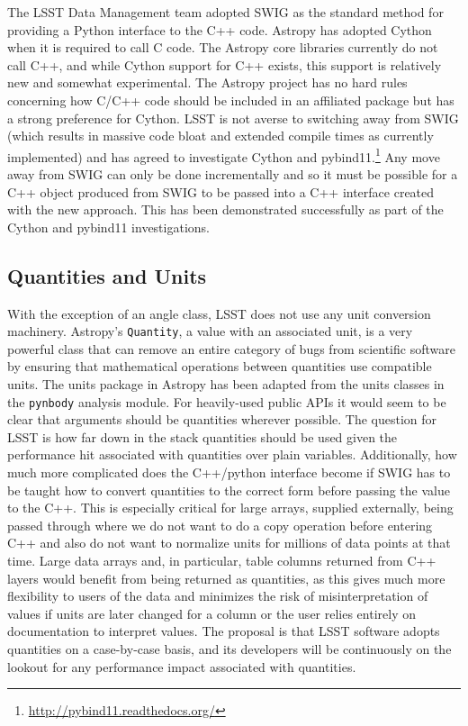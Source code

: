 \documentclass[]{spie}  %
\begin{document}
The LSST Data Management team adopted SWIG as the standard method for providing a Python interface to the C++ code.
Astropy has adopted Cython\cite{2010/content/aip/journal/cise/13/2/10.1109/MCSE.2010.118} when it is required to call C code.
The Astropy core libraries currently do not call C++, and while Cython support for C++ exists, this support is relatively new and somewhat experimental.
The Astropy project has no hard rules concerning how C/C++ code should be included in an affiliated package but has a strong preference for Cython.
LSST is not averse to switching away from SWIG (which results in massive code bloat and extended compile times as currently implemented) and has agreed to investigate Cython\cite{dmtn-013} and pybind11.\cite{dmtn-014}\footnote{\url{http://pybind11.readthedocs.org/}}
Any move away from SWIG can only be done incrementally and so it must be possible for a C++ object produced from SWIG to be passed into a C++ interface created with the new approach.
This has been demonstrated successfully as part of the Cython and pybind11 investigations.

\subsection{Quantities and Units}

With the exception of an angle class, LSST does not use any unit conversion machinery.
Astropy's \texttt{Quantity}, a value with an associated unit, is a very powerful class that can remove an entire category of bugs from scientific software by ensuring that mathematical operations between quantities use compatible units.
The units package in Astropy has been adapted from the units classes in the \texttt{pynbody} analysis module\cite{pynbody}.
For heavily-used public APIs it would seem to be clear that arguments should be quantities wherever possible.
The question for LSST is how far down in the stack quantities should be used given the performance hit associated with quantities over plain variables.
Additionally, how much more complicated does the C++/python interface become if SWIG has to be taught how to convert quantities to the correct form before passing the value to the C++.
This is especially critical for large arrays, supplied externally, being passed through where we do not want to do a copy operation before entering C++ and also do not want to normalize units for millions of data points at that time.
Large data arrays and, in particular, table columns returned from C++ layers would benefit from being returned as quantities, as this gives much more flexibility to users of the data and minimizes the risk of misinterpretation of values if units are later changed for a column or the user relies entirely on documentation to interpret values.
The proposal is that LSST software adopts quantities on a case-by-case basis, and its developers will be continuously on the lookout for any performance impact associated with quantities.
\end{document}
